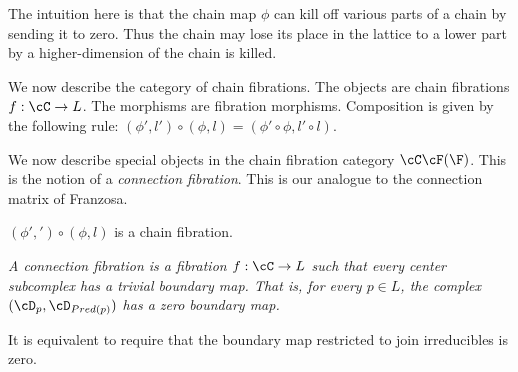 The intuition here is that the chain map $\phi$ can kill off various parts of a chain by sending it to zero.  Thus the chain may lose its place in the lattice to a lower part by a higher-dimension of the chain is killed.

We now describe the category of chain fibrations.  The objects are chain fibrations $f:\cC\to L$.  The morphisms are fibration morphisms.  Composition is given by the following rule: $(\phi',l')\circ (\phi,l) = (\phi'\circ \phi,l'\circ l)$.

We now describe special objects in the chain fibration category $\cC\cF(\F)$.  This is the notion of a {\em connection fibration}.  This is our analogue to the connection matrix of Franzosa.

\begin{prop}
$(\phi',')\circ (\phi,l)$ is a chain fibration.
\end{prop}


\begin{defn}
{\em
A {\em connection fibration} is a fibration $f:\cC\to L$ such that every center subcomplex has a trivial boundary map.  That is, for every $p\in L$, the complex $(\cD_p,\cD_{Pred(p)})$ has a zero boundary map.
}
\end{defn}

\begin{prop}
It is equivalent to require that the boundary map restricted to join irreducibles is zero.
\end{prop}



%
%


